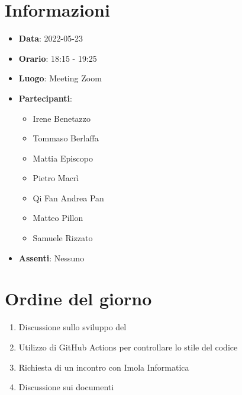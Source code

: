 \section{Informazioni}
	\begin{itemize}
		\item \textbf{Data}: 2022-05-23     %
		\item \textbf{Orario}: 18:15 - 19:25      %
		\item \textbf{Luogo}: Meeting Zoom
		\item \textbf{Partecipanti}:
		\begin{itemize}
			\item Irene Benetazzo
			\item Tommaso Berlaffa
			\item Mattia Episcopo
			\item Pietro Macrì
			\item Qi Fan Andrea Pan
			\item Matteo Pillon
			\item Samuele Rizzato
		\end{itemize}
        \item \textbf{Assenti}: Nessuno
	\end{itemize}
    
	\section{Ordine del giorno}
	\begin{enumerate}
		\item Discussione sullo sviluppo del 
  		\item Utilizzo di GitHub Actions per controllare lo stile del codice
      	\item Richiesta di un incontro con Imola Informatica
     	\item Discussione sui documenti
	\end{enumerate}
	\newpage